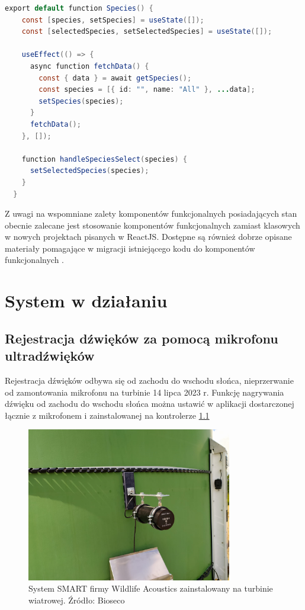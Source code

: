 \documentclass{sprz}
\begin{document}
\begin{lstlisting}[language=Java,caption={Przykład komponentu funkcjonalnego}, label={lst:functional_component}]
  export default function Species() {
    const [species, setSpecies] = useState([]);
    const [selectedSpecies, setSelectedSpecies] = useState([]);
  
    useEffect(() => {
      async function fetchData() {
        const { data } = await getSpecies();
        const species = [{ id: "", name: "All" }, ...data];
        setSpecies(species);
      }
      fetchData();
    }, []);
  
    function handleSpeciesSelect(species) {
      setSelectedSpecies(species);
    }
  }
\end{lstlisting}

Z uwagi na wspomniane zalety komponentów funkcjonalnych posiadających stan obecnie zalecane jest stosowanie komponentów funkcjonalnych zamiast klasowych w nowych projektach pisanych w ReactJS. Dostępne są również dobrze opisane materiały pomagające w migracji istniejącego kodu do komponentów funkcjonalnych \cite{react-component}.

\chapter{System w działaniu}

\section{Rejestracja dźwięków za pomocą mikrofonu ultradźwięków}
Rejestracja dźwięków odbywa się od zachodu do wschodu słońca, nieprzerwanie od zamontowania mikrofonu na turbinie 14 lipca 2023 r. Funkcję nagrywania dźwięku od zachodu do wschodu słońca można ustawić w aplikacji dostarczonej łącznie z mikrofonem i zainstalowanej na kontrolerze \ref{img:smart-installed}

\begin{figure}[h]
  \centering
  \includegraphics[width=0.8\textwidth]{sprz/smart-installed.png}
  \caption{System SMART firmy Wildlife Acoustics zainstalowany na turbinie wiatrowej. Źródło: Bioseco}
  \label{img:smart-installed}
\end{figure} 
\end{document}
